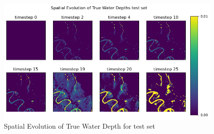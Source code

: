\begin{figure}[tbph]
	\centering
	\includegraphics[width=0.8\linewidth, height=0.3\textheight]{Figures/Results/Final_Results/Best_Model_True_test_set}
	\caption[Spatial Evolution of True Water Depth for test set]{Spatial Evolution of True Water Depth for test set}
	\label{fig:SpatialTrue}
\end{figure}


